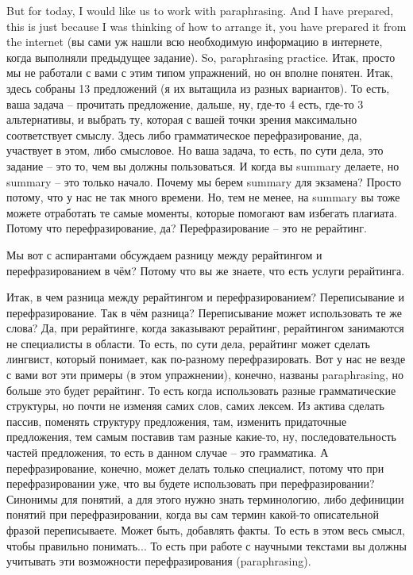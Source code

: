 \documentclass[main.tex]{subfiles}
\begin{document}
But for today, I would like us to work with paraphrasing.
And I have prepared, this is just because I was thinking of how to arrange it, you have prepared it from the internet (вы сами уж нашли всю необходимую информацию в интернете, когда выполняли предыдущее задание).
So, paraphrasing practice.
Итак, просто мы не работали с вами с этим типом упражнений, но он вполне понятен.
Итак, здесь собраны 13 предложений (я их вытащила из разных вариантов).
То есть, ваша задача -- прочитать предложение, дальше, ну, где-то 4 есть, где-то 3 альтернативы, и выбрать ту, которая с вашей точки зрения максимально соответствует смыслу.
Здесь либо грамматическое перефразирование, да, участвует в этом, либо смысловое.
Но ваша задача, то есть, по сути дела, это задание -- это то, чем вы должны пользоваться.
И когда вы summary делаете, но summary -- это только начало.
Почему мы берем summary для экзамена?
Просто потому, что у нас не так много времени.
Но, тем не менее, на summary вы тоже можете отработать те самые моменты, которые помогают вам избегать плагиата.
Потому что перефразирование, да?
Перефразирование -- это не рерайтинг.

Мы вот с аспирантами обсуждаем разницу между рерайтингом и перефразированием в чём?
Потому что вы же знаете, что есть услуги рерайтинга.

Итак, в чем разница между рерайтингом и перефразированием?
Переписывание и перефразирование.
Так в чём разница?
Переписывание может использовать те же слова?
Да, при рерайтинге, когда заказывают рерайтинг, рерайтингом занимаются не специалисты в области.
То есть, по сути дела, рерайтинг может сделать лингвист, который понимает, как по-разному перефразировать.
Вот у нас не везде с вами вот эти примеры (в этом упражнении), конечно, названы paraphrasing, но больше это будет рерайтинг.
То есть когда использовать разные грамматические структуры, но почти не изменяя самих слов, самих лексем.
Из актива сделать пассив, поменять структуру предложения, там, изменить придаточные предложения, тем самым поставив там разные какие-то, ну, последовательность частей предложения, то есть в данном случае -- это грамматика.
А перефразирование, конечно, может делать только специалист, потому что при перефразировании уже, что вы будете использовать при перефразировании?
Синонимы для понятий, а для этого нужно знать терминологию, либо дефиниции понятий при перефразировании, когда вы сам термин какой-то описательной фразой переписываете.
Может быть, добавлять факты.
То есть в этом весь смысл, чтобы правильно понимать...
То есть при работе с научными текстами вы должны учитывать эти возможности перефразирования (paraphrasing).
\end{document}

